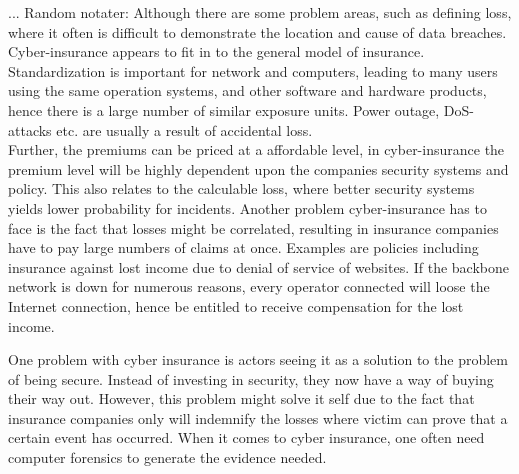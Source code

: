 ... Random notater:
 Although there are some problem areas, such as defining loss, where it often is difficult to
  demonstrate the location and cause of data breaches. Cyber-insurance appears to fit in to
   the general model of insurance. Standardization is important for network and computers, leading to
    many users using the same operation systems, and other software and hardware products, 
    hence there is a large number of similar exposure units. Power outage, DoS-attacks etc. 
    are usually a result of accidental loss.
 \\ Further, the premiums can be priced at a affordable level, in cyber-insurance the premium level
  will be highly dependent upon the companies security systems and policy.
   This also relates to the calculable loss, where better security systems
    yields lower probability for incidents. \cite{robinson2012incentives}
 Another problem cyber-insurance has to face is the fact that losses might be correlated, 
 resulting in insurance companies have to pay large numbers of claims at once. Examples are 
 policies including insurance against lost income due to denial of service of websites. 
 If the backbone network is down for numerous reasons, 
 every operator connected will loose the Internet connection, 
 hence be entitled to receive compensation for the lost income.   

 
   

 One problem with cyber insurance is actors seeing it as a solution to the problem of being secure. Instead of investing in security, they now have a way of buying their way out. However, this problem might solve it self due to the fact that insurance companies only will indemnify the losses where victim can prove that a certain event has occurred. When it comes to cyber insurance, one often need computer forensics to generate the evidence needed. 










